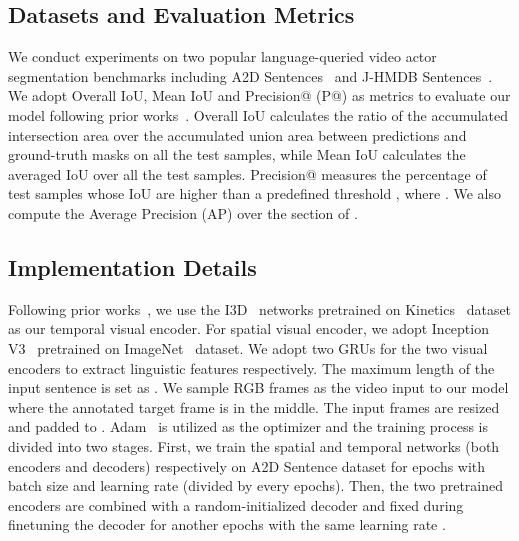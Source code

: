 \documentclass[final]{cvpr}
\begin{document}
\subsection{Datasets and Evaluation Metrics}
We conduct experiments on two popular language-queried video actor segmentation benchmarks including A2D Sentences~\cite{gavrilyuk2018actor} and J-HMDB Sentences~\cite{gavrilyuk2018actor}. 
We adopt Overall IoU, Mean IoU and Precision@ (P@) as metrics to evaluate our model following prior works~\cite{wang2019asymmetric, wang2020context}. 
Overall IoU calculates the ratio of the accumulated intersection area over the accumulated union area between predictions and ground-truth masks on all the test samples, while Mean IoU calculates the averaged IoU over all the test samples. 
Precision@ measures the percentage of test samples whose IoU are higher than a predefined threshold , where . 
We also compute the Average Precision (AP) over the section of .

\subsection{Implementation Details}
Following prior works~\cite{wang2019asymmetric, wang2020context, ning2020polar}, we use the I3D~\cite{carreira2017quo} networks pretrained on Kinetics~\cite{carreira2017quo} dataset as our temporal visual encoder. 
For spatial visual encoder, we adopt Inception V3~\cite{szegedy2016rethinking} pretrained on ImageNet~\cite{deng2009imagenet} dataset. 
We adopt two GRUs for the two visual encoders to extract linguistic features respectively. 
The maximum length of the input sentence is set as . 
We sample  RGB frames as the video input to our model where the annotated target frame is in the middle. 
The input frames are resized and padded to . 
Adam~\cite{kingma2014adam} is utilized as the optimizer and the training process is divided into two stages. 
First, we train the spatial and temporal networks (both encoders and decoders) respectively on A2D Sentence dataset for  epochs with batch size  and learning rate  (divided by  every  epochs). 
Then, the two pretrained encoders are combined with a random-initialized decoder and fixed during finetuning the decoder for another  epochs with the same learning rate .
\end{document}
